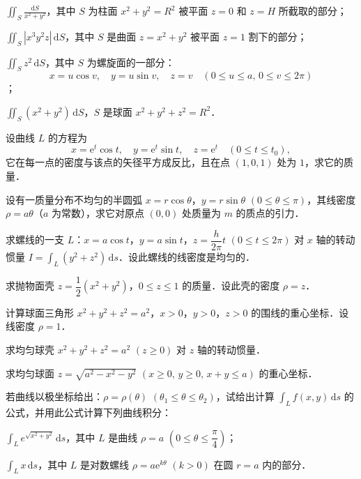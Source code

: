 \begin{xiti}
\begin{ziti}
\item $\displaystyle\iint_{S}\frac{\mathrm{d}S}{x^{2}+y^{2}}$，其中 $S$ 为柱面 $x^{2}+y^{2}=R^{2}$ 被平面 $z=0$ 和 $z=H$ 所截取的部分；
\item $\displaystyle\iint_{S}\left|x^{3}y^{2}z\right|\,\mathrm{d}S$，其中 $S$ 是曲面 $z=x^{2}+y^{2}$ 被平面 $z=1$ 割下的部分；
\item $\displaystyle\iint_{S}z^{2}\,\mathrm{d}S$，其中 $S$ 为螺旋面的一部分：
\[
x=u\cos v,\quad y=u\sin v,\quad z=v\quad\left(0\leqslant u\leqslant a,\,0\leqslant v\leqslant2\pi\right)
\]；
\item $\displaystyle\iint_{S}(x^{2}+y^{2})\,\mathrm{d}S$，$S$ 是球面 $x^{2}+y^{2}+z^{2}=R^{2}$．
\end{ziti}
\item 设曲线 $L$ 的方程为
\[
x=\mathrm{e}^{t}\cos t,\quad y=\mathrm{e}^{t}\sin t,\quad z=\mathrm{e}^{t}\quad\left(0\leqslant t\leqslant t_{0}\right),
\]
它在每一点的密度与该点的矢径平方成反比，且在点 $(1,0,1)$ 处为 $1$，求它的质量．
\item 设有一质量分布不均匀的半圆弧 $x=r\cos\theta$，$y=r\sin\theta$ $(0\leqslant\theta\leqslant\pi)$，其线密度 $\rho=a\theta$（$a$ 为常数），求它对原点 $(0,0)$ 处质量为 $m$ 的质点的引力．
\item 求螺线的一支 $L$：$x=a\cos t$，$y=a\sin t$，$z=\dfrac{h}{2\pi}t$ $(0\leqslant t\leqslant2\pi)$ 对 $x$ 轴的转动惯量 $I=\displaystyle\int_{L}(y^{2}+z^{2})\,\mathrm{d}s$．设此螺线的线密度是均匀的．
\item 求抛物面壳 $z=\dfrac{1}{2}(x^{2}+y^{2})$，$0\leqslant z\leqslant1$ 的质量．设此壳的密度 $\rho=z$．
\item 计算球面三角形 $x^{2}+y^{2}+z^{2}=a^{2}$，$x>0$，$y>0$，$z>0$ 的围线的重心坐标．设线密度 $\rho=1$．
\item 求均匀球壳 $x^{2}+y^{2}+z^{2}=a^{2}$ $(z\geqslant0)$ 对 $z$ 轴的转动惯量．
\item 求均匀球面 $z=\sqrt{a^{2}-x^{2}-y^{2}}$ $(x\geqslant0,\,y\geqslant0,\,x+y\leqslant a)$ 的重心坐标．
\item 若曲线以极坐标给出：$\rho=\rho(\theta)$ $(\theta_{1}\leqslant\theta\leqslant\theta_{2})$，试给出计算 $\displaystyle\int_{L}f(x,y)\,\mathrm{d}s$ 的公式，并用此公式计算下列曲线积分：
\begin{ziti}
\item $\displaystyle\int_{L}e^{\sqrt{x^{2}+y^{2}}}\,\mathrm{d}s$，其中 $L$ 是曲线 $\rho=a$ $\left(0\leqslant\theta\leqslant\dfrac{\pi}{4}\right)$；
\item $\displaystyle\int_{L}x\,\mathrm{d}s$，其中 $L$ 是对数螺线 $\rho=a\mathrm{e}^{k\theta}$ $(k>0)$ 在圆 $r=a$ 内的部分．

\end{ziti}
\end{xiti}
